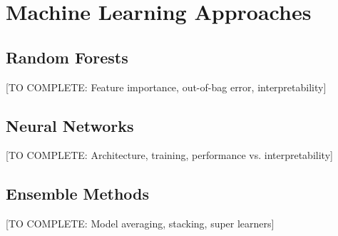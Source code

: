 \section{Machine Learning Approaches}

\subsection{Random Forests}

[TO COMPLETE: Feature importance, out-of-bag error, interpretability]

\subsection{Neural Networks}

[TO COMPLETE: Architecture, training, performance vs. interpretability]

\subsection{Ensemble Methods}

[TO COMPLETE: Model averaging, stacking, super learners]